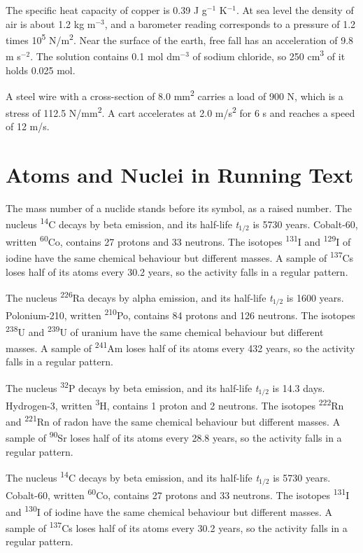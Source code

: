 \documentclass[11pt]{article}
\begin{document}
The specific heat capacity of copper is 0.39 J g$^{-1}$ K$^{-1}$. At sea level the density of air is about 1.2 kg m$^{-3}$, and a barometer reading corresponds to a pressure of 1.2 times 10\textsuperscript{5} N/m\textsuperscript{2}. Near the surface of the earth, free fall has an acceleration of 9.8 m s$^{-2}$. The solution contains 0.1 mol dm$^{-3}$ of sodium chloride, so 250 cm\textsuperscript{3} of it holds 0.025 mol.

A steel wire with a cross-section of 8.0 mm\textsuperscript{2} carries a load of 900 N, which is a stress of 112.5 N/mm\textsuperscript{2}. A cart accelerates at 2.0 m/s\textsuperscript{2} for 6 s and reaches a speed of 12 m/s.
\section*{Atoms and Nuclei in Running Text}
The mass number of a nuclide stands before its symbol, as a raised number.
The nucleus \textsuperscript{14}C decays by beta emission, and its half-life \textit{t}$_{1/2}$ is 5730 years. Cobalt-60, written \textsuperscript{60}Co, contains 27 protons and 33 neutrons. The isotopes \textsuperscript{131}I and \textsuperscript{129}I of iodine have the same chemical behaviour but different masses. A sample of \textsuperscript{137}Cs loses half of its atoms every 30.2 years, so the activity falls in a regular pattern.

The nucleus \textsuperscript{226}Ra decays by alpha emission, and its half-life \textit{t}$_{1/2}$ is 1600 years. Polonium-210, written \textsuperscript{210}Po, contains 84 protons and 126 neutrons. The isotopes \textsuperscript{238}U and \textsuperscript{239}U of uranium have the same chemical behaviour but different masses. A sample of \textsuperscript{241}Am loses half of its atoms every 432 years, so the activity falls in a regular pattern.

The nucleus \textsuperscript{32}P decays by beta emission, and its half-life \textit{t}$_{1/2}$ is 14.3 days. Hydrogen-3, written \textsuperscript{3}H, contains 1 proton and 2 neutrons. The isotopes \textsuperscript{222}Rn and \textsuperscript{221}Rn of radon have the same chemical behaviour but different masses. A sample of \textsuperscript{90}Sr loses half of its atoms every 28.8 years, so the activity falls in a regular pattern.

The nucleus \textsuperscript{14}C decays by beta emission, and its half-life \textit{t}$_{1/2}$ is 5730 years. Cobalt-60, written \textsuperscript{60}Co, contains 27 protons and 33 neutrons. The isotopes \textsuperscript{131}I and \textsuperscript{130}I of iodine have the same chemical behaviour but different masses. A sample of \textsuperscript{137}Cs loses half of its atoms every 30.2 years, so the activity falls in a regular pattern.
\end{document}
